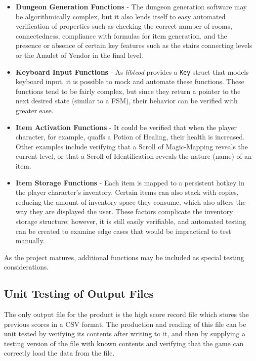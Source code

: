 \documentclass[12pt, titlepage]{article}
\begin{document}
		\begin{itemize}
			\item \textbf{Dungeon Generation Functions} - The dungeon generation software may be algorithmically complex, but it also lends itself to easy automated verification of properties such as checking the correct number of rooms, connectedness, compliance with formulas for item generation, and the presence or absence of certain key features such as the stairs connecting levels or the Amulet of Yendor in the final level.
			\item \textbf{Keyboard Input Functions} - As \textit{libtcod} provides a \lstinline$Key$ struct that models keyboard input, it is possible to mock and automate these functions.  These functions tend to be fairly complex, but since they return a pointer to the next desired state (similar to a FSM), their behavior can be verified with greater ease.
			\item \textbf{Item Activation Functions} - It could be verified that when the player character, for example, quaffs a Potion of Healing, their health is increased.  Other examples include verifying that a Scroll of Magic-Mapping reveals the current level, or that a Scroll of Identification reveals the nature (name) of an item.
			\item \textbf{Item Storage Functions} - Each item is mapped to a persistent hotkey in the player character's inventory.  Certain items can also stack with copies, reducing the amount of inventory space they consume, which also alters the way they are displayed the user.  These factors complicate the inventory storage structure; however, it is still easily verifiable, and automated testing can be created to examine edge cases that would be impractical to test manually.
		\end{itemize}

		As the project matures, additional functions may be included as special testing considerations.

	\subsection{Unit Testing of Output Files}
		The only output file for the product is the high score record file which stores the previous scores in a CSV format.  The production and reading of this file can be unit tested by verifying its contents after writing to it, and then by supplying a testing version of the file with known contents and verifying that the game can correctly load the data from the file.
\end{document}
